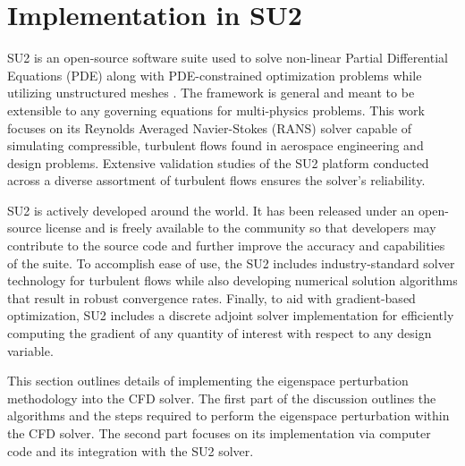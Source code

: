 \section{Implementation in SU2}

SU2 is an open-source software suite used to solve non-linear Partial Differential Equations (PDE) along with PDE-constrained optimization problems while utilizing unstructured meshes \cite{su21}.
The framework is general and meant to be extensible to any governing equations for multi-physics problems.
This work focuses on its Reynolds Averaged Navier-Stokes (RANS) solver capable of simulating compressible, turbulent flows found in aerospace engineering and design problems.
Extensive validation studies of the SU2 platform conducted across a diverse assortment of turbulent flows \cite{su22} ensures the solver's reliability.

SU2 is actively developed around the world.
It has been released under an open-source license and is freely available to the community so that developers may contribute to the source code and further improve the accuracy and capabilities of the suite.
To accomplish ease of use, the SU2 includes industry-standard solver technology for turbulent flows while also developing numerical solution algorithms that result in robust convergence rates.
Finally, to aid with gradient-based optimization, SU2 includes a discrete adjoint solver implementation for efficiently computing the gradient of any quantity of interest with respect to any design variable.

This section outlines details of implementing the eigenspace perturbation methodology into the CFD solver.
The first part of the discussion outlines the algorithms and the steps required to perform the eigenspace perturbation within the CFD solver.
The second part focuses on its implementation via computer code and its integration with the SU2 solver. 

